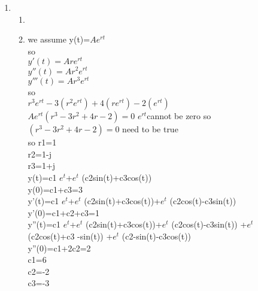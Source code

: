 \documentclass[10pt,a4paper, margin=1in]{article}
\begin{document}
\begin{enumerate}
\item %
    \begin{enumerate}
    \item %
    \item %
    we assume y(t)=$Ae^{rt} $ \\ 
    so \\
    $y'(t)= Ar e^{rt}$ \\
    $y''(t)= Ar^2 e^{rt}$ \\
    $y'''(t)= Ar^3 e^{rt}$ \\
    so \\
    $r^3 e^{rt} -3(r^2 e^{rt})+4(r e^{rt})-2(e^{rt})$ \\
    $Ae^{rt} (r^3-3r^2+4r-2)=0$ $e^{rt} $cannot be zero so $ (r^3-3r^2+4r-2)=0$ need to be true \\
    so r1=1 \\
    r2=1-j \\
    r3=1+j \\
    y(t)=c1 $e^{t} $+$e^{t}$ (c2sin(t)+c3cos(t))  \\
    y(0)=c1+c3=3 \\
    y'(t)=c1 $e^{t} $+$e^{t}$ (c2sin(t)+c3cos(t))+$e^{t}$ (c2cos(t)-c3sin(t)) \\
    y'(0)=c1+c2+c3=1 \\
    y''(t)=c1 $e^{t} $+$e^{t}$ (c2sin(t)+c3cos(t))+$e^{t}$ (c2cos(t)-c3sin(t)) +$e^{t}$ (c2cos(t)+c3 -sin(t)) +$e^{t}$ (c2-sin(t)-c3cos(t)) \\
    y''(0)=c1+2c2=2 \\
    c1=6 \\
    c2=-2 \\
    c3=-3 \\
     
    
    \end{enumerate}



\end{enumerate}
\end{document}

